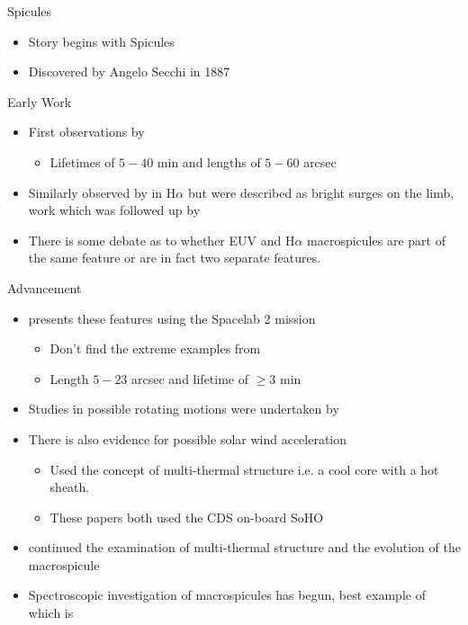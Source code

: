 \documentclass{beamer}
\begin{document}
	\begin{frame}{Spicules}
		\begin{itemize}
			\item{Story begins with Spicules}
			\item{Discovered by Angelo Secchi in 1887}
		\end{itemize}
	\end{frame}


	\begin{frame}{Early Work}
		\begin{itemize}
			\item{First observations by \cite{Bohlin1975}}
				\begin{itemize}
				\item{Lifetimes of $5 - 40$ min and lengths of $5 - 60$ arcsec}
				\end{itemize}
			\item{Similarly observed by \cite{Godoli1967} in H$\alpha$ but were described as bright surges on the limb, work which was followed up by \cite{LaBonte79}}	
			\item{There is some debate as to whether EUV and H$\alpha$ macrospicules are part of the same feature or are in fact two separate features.} 
		\end{itemize}	
	\end{frame}

	\begin{frame}{Advancement}
		\begin{itemize}
			\item{\cite{Dere89} presents these features using the Spacelab 2 mission}
				\begin{itemize}
					\item{Don't find the extreme examples from \cite{Bohlin1975}}
					\item{Length $5 - 23$ arcsec and lifetime of $\geq 3$ min}
				\end{itemize}
			\item{Studies in possible rotating motions were undertaken by \cite{Pike_Mason1998}}
			\item{There is also evidence for possible solar wind acceleration \cite{Pike_Harrison1997}}
				\begin{itemize}
					\item{Used the concept of multi-thermal structure i.e. a cool core with a hot sheath.}
					\item{These papers both used the CDS on-board SoHO} 
				\end{itemize}
			\item{\cite{Parenti2002} continued the examination of multi-thermal structure and the evolution of the macrospicule}
			\item{Spectroscopic investigation of macrospicules has begun, best example of which is \cite{Scullion2010}}
		\end{itemize}
	\end{frame}
	
\end{document}
